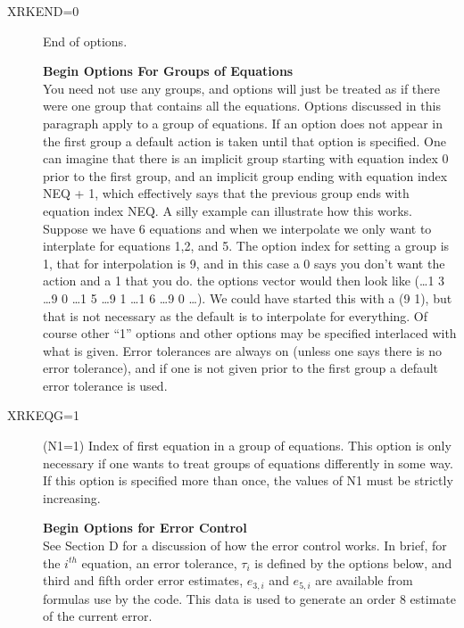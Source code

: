 \documentclass[twoside]{MATH77}
\begin{document}
\begin{description}
\item[XRKEND=0] End of options.
\item[ ] {\bf \hspace{-10pt} Begin Options For Groups of Equations}\\
  You need not use any groups, and options will just be treated as if
  there were one group that contains all the equations.  Options
  discussed in this paragraph apply to a group of equations.  If an
  option does not appear in the first group a default action is taken
  until that option is specified.  One can imagine that there is an
  implicit group starting with equation index 0 prior to the first
  group, and an implicit group ending with equation index NEQ + 1,
  which effectively says that the previous group ends with equation
  index NEQ.  A silly example can illustrate how this works.  Suppose
  we have 6 equations and when we interpolate we only want to
  interplate for equations 1,2, and 5.  The option index for setting a
  group is 1, that for interpolation is 9, and in this case a 0 says
  you don't want the action and a 1 that you do.  the options vector
  would then look like (\ldots 1 3 \ldots 9 0 \ldots 1 5 \ldots 9 1
  \ldots 1 6 \ldots 9 0 \ldots).  We could have started this with a (9
  1), but that is not necessary as the default is to interpolate for
  everything.  Of course other ``1'' options and other options may be
  specified interlaced with what is given.  Error tolerances are
  always on (unless one says there is no error tolerance), and if one
  is not given prior to the first group a default error tolerance is
  used.

\item[XRKEQG=1] (N1=1) Index of first equation in a group of
  equations.  This option is only necessary if one wants to treat
  groups of equations differently in some way.  If this option is
  specified more than once, the values of N1 must be strictly
  increasing.

\item[ ] {\bf Begin Options for Error Control}\\
  See Section D for a discussion of how the error control works.  In
  brief, for the $i^{th}$ equation, an error tolerance, $\tau_i$ is
  defined by the options below, and third and fifth order error
  estimates, $e_{3,i}$ and $e_{5,i}$ are available from formulas use
  by the code.  This data is used to generate an order 8 estimate of
  the current error.


\end{description}
\end{document}
